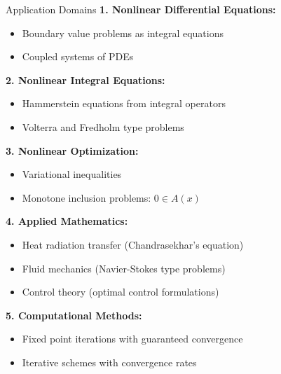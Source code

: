 \documentclass[aspectratio=169,10pt]{beamer}
\begin{document}
\begin{frame}{Application Domains}
    \textbf{1. Nonlinear Differential Equations:}
    \begin{itemize}
        \item Boundary value problems as integral equations
        \item Coupled systems of PDEs
    \end{itemize}

    \vspace{0.2cm}

    \textbf{2. Nonlinear Integral Equations:}
    \begin{itemize}
        \item Hammerstein equations from integral operators
        \item Volterra and Fredholm type problems
    \end{itemize}

    \vspace{0.2cm}

    \textbf{3. Nonlinear Optimization:}
    \begin{itemize}
        \item Variational inequalities
        \item Monotone inclusion problems: $0 \in A(x)$
    \end{itemize}

    \vspace{0.2cm}

    \textbf{4. Applied Mathematics:}
    \begin{itemize}
        \item Heat radiation transfer (Chandrasekhar's equation)
        \item Fluid mechanics (Navier-Stokes type problems)
        \item Control theory (optimal control formulations)
    \end{itemize}

    \vspace{0.2cm}

    \textbf{5. Computational Methods:}
    \begin{itemize}
        \item Fixed point iterations with guaranteed convergence
        \item Iterative schemes with convergence rates
    \end{itemize}
\end{frame}
\end{document}
